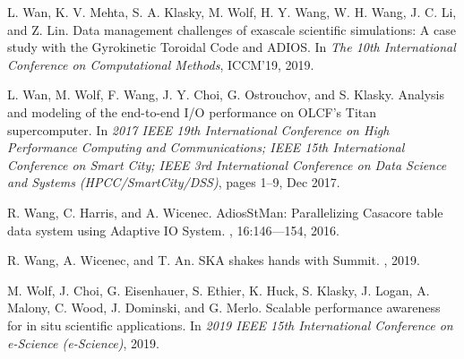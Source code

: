 \begin{thebibliography}{10}
 L. Wan, K. V. Mehta, S. A. Klasky, M. Wolf, H. Y. Wang, W. H. Wang, J. C. Li, and Z. Lin. \newblock Data management challenges of exascale
scientific simulations:  A case study with the Gyrokinetic Toroidal Code and ADIOS. \newblock In {\em The 10th International Conference on Computational Methods},  ICCM’19, 2019.

 L. Wan, M. Wolf, F. Wang, J. Y. Choi, G. Ostrouchov, and S. Klasky. \newblock Analysis and modeling of the end-to-end I/O performance on OLCF’s Titan supercomputer.  \newblock In {\em 2017 IEEE 19th International Conference on High Performance Computing and Communications; IEEE 15th International Conference on Smart City; IEEE 3rd International Conference on Data Science and Systems (HPCC/SmartCity/DSS)}, pages 1–9, Dec 2017.

 R. Wang, C. Harris, and A. Wicenec.  \newblock AdiosStMan: Parallelizing Casacore table data system using Adaptive IO System. , 16:146---154, 2016.

 R. Wang, A. Wicenec, and T. An.  \newblock SKA shakes hands with Summit. , 2019.

 M. Wolf, J. Choi, G. Eisenhauer, S. Ethier, K. Huck, S. Klasky, J. Logan, A. Malony, C. Wood, J. Dominski, and G. Merlo.  \newblock Scalable
performance awareness for in situ scientific applications. \newblock In {\em 2019 IEEE 15th International Conference on e-Science (e-Science)}, 2019.

\end{thebibliography} 

% 



